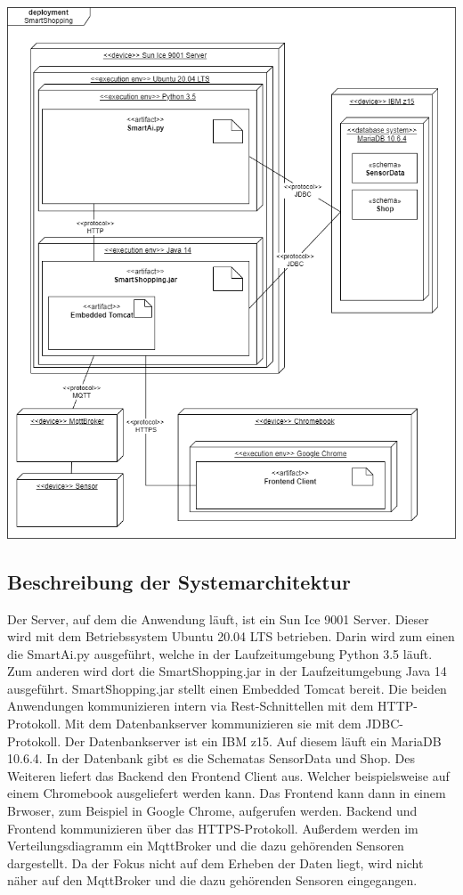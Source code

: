 \documentclass[runningheads]{llncs}
\begin{document}
\includegraphics[width=\linewidth]{images/deployment_diagram}


\subsection{Beschreibung der Systemarchitektur}


Der Server, auf dem die Anwendung läuft, ist ein Sun Ice 9001 Server.
Dieser wird mit dem Betriebssystem Ubuntu 20.04 LTS betrieben.
Darin wird zum einen die SmartAi.py ausgeführt, welche in der Laufzeitumgebung Python 3.5 läuft.
Zum anderen wird dort die SmartShopping.jar in der Laufzeitumgebung Java 14 ausgeführt.
SmartShopping.jar stellt einen Embedded Tomcat bereit.
Die beiden Anwendungen kommunizieren intern via Rest-Schnittellen mit dem HTTP-Protokoll.
Mit dem Datenbankserver kommunizieren sie mit dem JDBC-Protokoll.
Der Datenbankserver ist ein IBM z15.
Auf diesem läuft ein MariaDB 10.6.4.
In der Datenbank gibt es die Schematas SensorData und Shop.
Des Weiteren liefert das Backend den Frontend Client aus.
Welcher beispielsweise auf einem Chromebook ausgeliefert werden kann.
Das Frontend kann dann in einem Brwoser, zum Beispiel in Google Chrome, aufgerufen werden.
Backend und Frontend kommunizieren über das HTTPS-Protokoll.
Außerdem werden im Verteilungsdiagramm ein MqttBroker und die dazu gehörenden Sensoren dargestellt.
Da der Fokus nicht auf dem Erheben der Daten liegt, wird nicht näher auf den MqttBroker und die dazu gehörenden Sensoren eingegangen.
\end{document}
